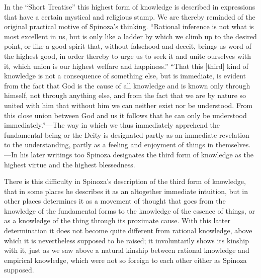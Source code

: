 \documentclass[12pt]{book}
\newcommand{\opage}[1]{\marginnote{\footnotesize\textit{[#1]}}}
\begin{document}
In the ``Short Treatise'' this highest form of knowledge is described in expressions
that have a certain mystical and religious stamp. We are thereby reminded of the
original practical motive of Spinoza's thinking. ``Rational inference is not what is
most excellent in us, but is only like a ladder by which we climb up to the desired
point, or like a good spirit that, without falsehood and deceit, brings us word of the
highest good, in order thereby to urge us to seek it and unite ourselves with it, which
union is our highest welfare and happiness.'' ``That this [third] kind of knowledge is
not a consequence of something else, but is immediate, is evident from the fact that God
is the cause of all knowledge and is known only through himself, not through anything
else, and from the fact that we are by nature so united with him that without him we
can neither exist nor be understood. From this close union between God and us it
follows that he can only be understood immediately.''---The way in which we thus
immediately apprehend the fundamental being or the Deity is designated partly as an
immediate revelation to the understanding, partly as a feeling and enjoyment of things
in themselves.---In his later writings too Spinoza designates the third form of
knowledge as the highest virtue and the highest blessedness.

There is this difficulty in Spinoza's description of the third form of knowledge, that
in some places he describes it as an altogether immediate intuition, but in other places
determines it as a movement \opage{113}of thought that goes from the knowledge of the
fundamental forms to the knowledge of the essence of things, or as a knowledge of the
thing through its proximate cause. With this latter determination it does not become
quite different from rational knowledge, above which it is nevertheless supposed to be
raised; it involuntarily shows its kinship with it, just as we saw above a natural
kinship between rational knowledge and empirical knowledge, which were not so foreign
to each other either as Spinoza supposed.
\end{document}
